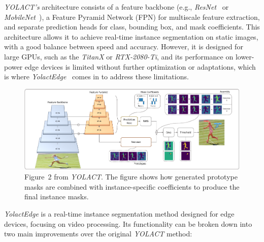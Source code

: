 \textit{YOLACT's} architecture consists of a feature backbone (e.g., \textit{ResNet}~\cite{targ2016resnet} or \textit{MobileNet}~\cite{howard2017mobilenets}), a Feature Pyramid Network (FPN) for multiscale feature extraction, and separate prediction heads for class, bounding box, and mask coefficients.
This architecture allows it to achieve real-time instance segmentation on static images, with a good balance between speed and accuracy.
However, it is designed for large GPUs, such as the \textit{TitanX} or \textit{RTX-2080-Ti}, and its performance on lower-power edge devices is limited without further optimization or adaptations, which is where \textit{YolactEdge}~\cite{liu2021yolactedge} comes in to address these limitations.

\begin{figure}[htb]
    \includegraphics[width=\linewidth]{figures/yolact_fig_2-cropped}
    \caption{Figure~2 from \textit{YOLACT}. The figure shows how generated prototype masks are combined with instance-specific coefficients to produce the final instance masks.}
    \label{fig:yolact}
\end{figure}

\textit{YolactEdge} is a real-time instance segmentation method designed for edge devices, focusing on video processing.
Its functionality can be broken down into two main improvements over the original \textit{YOLACT} method:

